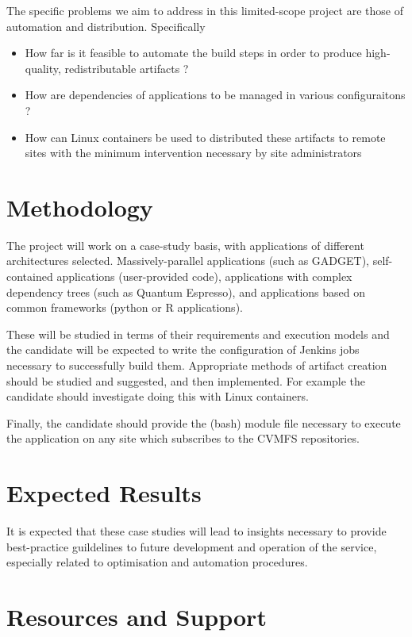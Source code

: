 \documentclass[oneside, a4paper, onecolumn, 11pt]{article}
\begin{document}
The specific problems we aim to address in this limited-scope project are those of automation and distribution. Specifically

\begin{itemize}
\item How far is it feasible to automate the build steps in order to produce high-quality, redistributable artifacts ?
\item How are dependencies of applications to be managed in various configuraitons ?
\item How can Linux containers be used to distributed these artifacts to remote sites with the minimum intervention necessary by site administrators
\end{itemize}

\section{Methodology}

The project will work on a case-study basis, with applications of different architectures selected. Massively-parallel applications (such as GADGET), self-contained applications (user-provided code), applications with complex dependency trees (such as Quantum Espresso), and applications based on common frameworks (python or R applications).

These will be studied in terms of their requirements and execution models and the candidate will be expected to write the configuration of Jenkins jobs necessary to successfully build them. Appropriate methods of artifact creation should be studied and suggested, and then implemented. For example the candidate should investigate doing this with Linux containers.

Finally, the candidate should provide the (bash) module file necessary to execute the application on any site which subscribes to the CVMFS repositories.

\section{Expected Results}

It is expected that these case studies will lead to insights necessary to provide best-practice guildelines to future development and operation of the service, especially related to optimisation and automation procedures.

\section{Resources and Support}
\end{document}

